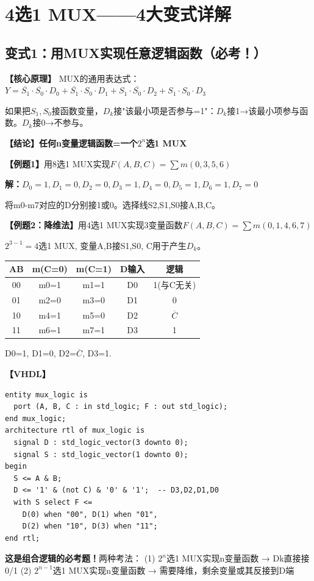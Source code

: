 \chapter{4选1 MUX——4大变式详解}

\section{变式1：用MUX实现任意逻辑函数（必考！）}

\begin{detailbox}[完整教学]
\textbf{【核心原理】}
MUX的通用表达式：$Y=\overline{S_1}\cdot\overline{S_0}\cdot D_0+\overline{S_1}\cdot S_0\cdot D_1+S_1\cdot\overline{S_0}\cdot D_2+S_1\cdot S_0\cdot D_3$

如果把$S_1,S_0$接函数变量，$D_k$接"该最小项是否参与=1"：$D_k$接1→该最小项参与函数。$D_k$接0→不参与。

\textbf{【结论】任何n变量逻辑函数=一个$2^n$选1 MUX}

\textbf{【例题1】}用8选1 MUX实现$F(A,B,C)=\sum m(0,3,5,6)$

\textbf{解：}$D_0=1,D_1=0,D_2=0,D_3=1,D_4=0,D_5=1,D_6=1,D_7=0$

将m0-m7对应的D分别接1或0。选择线S2,S1,S0接A,B,C。

\textbf{【例题2：降维法】}用4选1 MUX实现3变量函数$F(A,B,C)=\sum m(0,1,4,6,7)$

$2^{3-1}=4$选1 MUX, 变量A,B接S1,S0, C用于产生$D_k$。

\begin{center}
\begin{tabular}{|c|c|c|c|c|}
\hline
AB & m(C=0) & m(C=1) & D输入 & 逻辑 \\
\hline
00 & m0=1 & m1=1 & D0 & 1(与C无关) \\
01 & m2=0 & m3=0 & D1 & 0 \\
10 & m4=1 & m5=0 & D2 & $\overline{C}$ \\
11 & m6=1 & m7=1 & D3 & 1 \\
\hline
\end{tabular}
\end{center}

D0=1, D1=0, D2=$\overline{C}$, D3=1.

\textbf{【VHDL】}
\begin{lstlisting}
entity mux_logic is
  port (A, B, C : in std_logic; F : out std_logic);
end mux_logic;
architecture rtl of mux_logic is
  signal D : std_logic_vector(3 downto 0);
  signal S : std_logic_vector(1 downto 0);
begin
  S <= A & B;
  D <= '1' & (not C) & '0' & '1';  -- D3,D2,D1,D0
  with S select F <=
    D(0) when "00", D(1) when "01",
    D(2) when "10", D(3) when "11";
end rtl;
\end{lstlisting}

\begin{examfocus}
\textbf{这是组合逻辑的必考题！}两种考法：
(1) $2^n$选1 MUX实现n变量函数 → Dk直接接0/1
(2) $2^{n-1}$选1 MUX实现n变量函数 → 需要降维，剩余变量或其反接到D端
\end{examfocus}
\end{detailbox}


